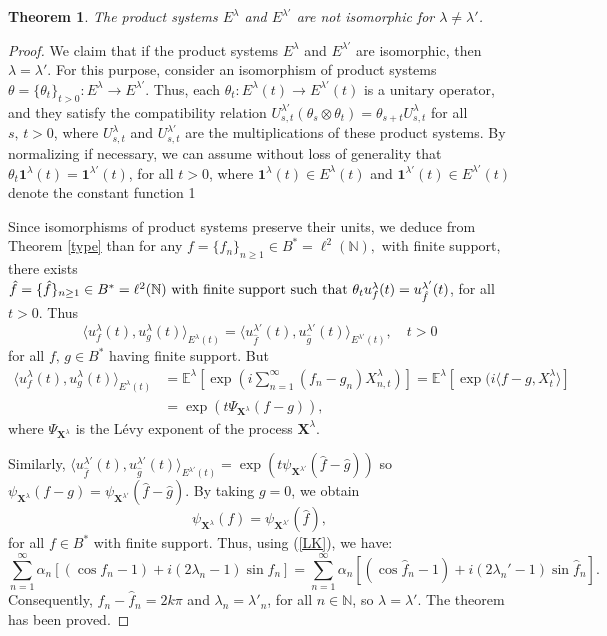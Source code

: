 \documentclass[11pt]{amsart}
\newtheorem{theorem}{Theorem}[section]
\theoremstyle{definition}
\theoremstyle{remark}
\numberwithin{equation}{section}
\begin{document}
\begin{theorem}\label{last}
The product systems  \( E^\lambda \) and \( E^{\lambda'} \) are not isomorphic for \( \lambda \neq \lambda' \).
\end{theorem}
\begin{proof}
We claim  that if the product systems  \( E^\lambda \) and \( E^{\lambda'} \) are isomorphic, then \( \lambda = \lambda' \). For this purpose, consider  an isomorphism of product systems \(\theta=\{\theta_t\}_{t>0}: E^\lambda \to E^{\lambda'} \). Thus, each \(\theta_t:E^\lambda(t)\to E^{\lambda'}(t)\) is a unitary operator, and they satisfy the compatibility relation \(U_{s,t}^{\lambda'}(\theta_s\otimes \theta_t)=\theta_{s+t}U_{s,t}^\lambda\) for all \(s,\,t>0\), where \(U_{s,t}^\lambda\) and \(U_{s,t}^{\lambda'}\) are the multiplications of these product systems. By normalizing if necessary, we can assume without loss of generality that \(\theta_t\bm{1}^\lambda(t) =\bm{1}^{\lambda'}(t)\), for all \(t>0\), where \(\bm{1}^\lambda(t)\in E^\lambda(t) \) and  \(\bm{1}^{\lambda'}(t)\in E^{\lambda'}(t) \) denote the constant function 1

Since isomorphisms of product systems preserve their units, we deduce from Theorem \ref{type} than for any \( f = \{f_n\}_{n\geq 1}\in B^*= \ell^2(\mathbb{N}),\) with finite support, there exists \(\hat{f} = \{\hat{f}\}_{n\geq 1}\in B^*= \ell^2(\mathbb{N})$ with finite support such that \(\theta_tu_f^\lambda(t)=u_{\hat{f}}^{\lambda'}(t)\), for all \(t>0\). Thus  \[\langle u_f^\lambda(t), u_g^\lambda(t) \rangle_{E^\lambda(t)}=\langle u_{\hat{f}}^{\lambda'}(t), u_{\hat{g}}^{\lambda'}(t) \rangle_{E^{\lambda'}(t)},\quad t>0\] for all \(f,\,g\in B^*\) having finite support. But 
\begin{align*}
\langle u_f^\lambda(t), u_g^\lambda(t) \rangle_{E^\lambda(t)}&=\mathbb{E}^\lambda\left[\exp(i\sum_{n=1}^\infty(f_n-g_n)X_{n, t}^\lambda )\right]=\mathbb{E}^\lambda\left[\exp(i\langle f-g, X_t^\lambda \rangle \right]\\&=\exp (t\Psi_{{\bm{X}}^\lambda} (f-g)),\end{align*} where 
\(\Psi_{\bm{X}^\lambda}\) is the L\'evy exponent of the process \(\bm{X}^\lambda\). 

Similarly, \(\langle u_{\hat{f}}^{\lambda'}(t), u_{\hat{g}}^{\lambda'}(t) \rangle_{E^{\lambda'}(t)}=\exp (t\psi_{{\bm{X}}^{\lambda'}} (\hat{f}-\hat{g}))\) so \(\psi_{\bm{X}^\lambda} (f-g)=\psi_{\bm{X}^{\lambda'}}(\hat{f}-\hat{g}).\) By taking \(g=0\), we obtain  \[
\psi_{\bm{X}^\lambda} (f)=\psi_{\bm{X}^{\lambda'}}(\hat{f}),
\]
for all \(f\in B^*\) with finite support. Thus, using (\ref{LK}), we have:
\[\sum_{n=1}^\infty\alpha_n[(\cos f_n-1)+i(2\lambda_n-1)\sin f_n]=\sum_{n=1}^\infty\alpha_n[(\cos \hat{f}_n-1)+i(2\lambda_n'-1)\sin \hat{f}_n].\]
Consequently, \(f_n-\hat{f}_n=2k\pi\) and \(\lambda_n=\lambda'_n\), for all \(n\in\mathbb{N}\), so \(\lambda =\lambda'\). The theorem has been proved.
\end{proof}
\end{document}
